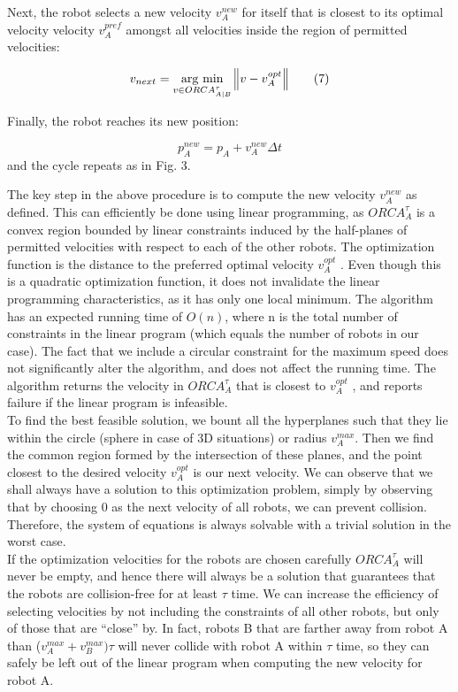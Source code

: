 \documentclass[12pt]{report}
\newcommand{\argmin}[1]{\underset{#1}{\operatorname{arg}\,\operatorname{min}}\;}
\begin{document}
Next, the robot selects a new velocity $v^{new}_{A}$ for itself that is closest to its optimal velocity velocity $v^{pref}_{A}$ amongst all velocities inside the region of permitted velocities:

\begin{equation}
v_{next} = \argmin{v \in ORCA^{\tau}_{A|B}}{\norm {v-v_{A}^{opt}}} \tag{7}
\end{equation}

Finally, the robot reaches its new position:

\begin{equation}
p^{new}_{A} = p_{A} + v^{new}_{A} \Delta t \tag{8}
\end{equation}
and the cycle repeats as in Fig. 3. 

The key step in the above procedure is to compute the new velocity $v^{new}_{A}$ as defined. This can efficiently be done using linear programming, as $ORCA^{\tau}_{A}$ is a convex region bounded by linear constraints induced by the half-planes of permitted velocities with respect to each of the other robots. The optimization function is the distance to the preferred optimal velocity $v^{opt}_{A}$ . Even though this is a quadratic optimization function, it does not invalidate the linear programming characteristics, as it has only one local minimum. The algorithm has an expected running time of $O(n)$, where n is the total number of constraints in the linear program (which equals the number of robots in our case). The fact that we include a circular constraint for the maximum speed does not significantly alter the algorithm, and does not affect the running time. The algorithm returns the velocity in $ORCA^{\tau}_{A}$ that is closest to $v^{opt}_{A}$ , and reports failure if the linear program is infeasible.\\

To find the best feasible solution, we bount all the hyperplanes such that they lie within the circle (sphere in case of 3D situations) or radius $v^{max}_{A}$. Then we find the common region formed by the intersection of these planes, and the point closest to the desired velocity $v^{opt}_{A}$ is our next velocity. We can observe that we shall always have a solution to this optimization problem, simply by observing that by choosing 0 as the next velocity of all robots, we can prevent collision. Therefore, the system of equations is always solvable with a trivial solution in the worst case.\\

If the optimization velocities for the robots are chosen carefully $ORCA^{\tau}_{A}$ will never be empty, and hence there will always be a solution that guarantees that the robots are collision-free for at least $\tau$ time. We can increase the efficiency of selecting velocities by not including the constraints of all other robots, but only of those that are “close” by. In fact, robots B that are farther away from robot A than ($v^{max}_{A} + v^{max}_{B})\tau$ will never collide with robot A within $\tau$ time, so they can safely be left out of the linear program when computing the new velocity for robot A.
\end{document}
